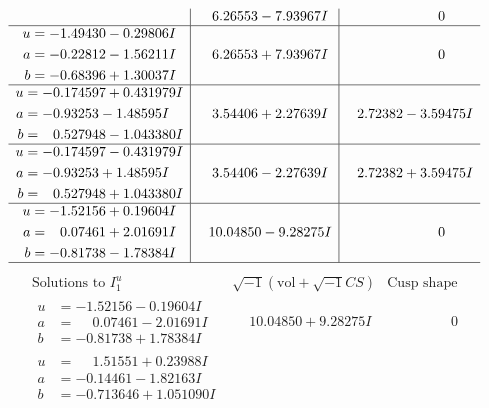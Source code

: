 \documentclass[1p]{elsarticle_modified}
\theoremstyle{definition}
\newcommand{\I}{\sqrt{-1}}
\begin{document}
$$\begin{array}{c|c|c}
 & \phantom{-}6.26553 - 7.93967 I & \phantom{-0.000000 } 0 \\ \hline\begin{aligned}
u &= -1.49430 - 0.29806 I \\
a &= -0.22812 - 1.56211 I \\
b &= -0.68396 + 1.30037 I\end{aligned}
 & \phantom{-}6.26553 + 7.93967 I & \phantom{-0.000000 } 0 \\ \hline\begin{aligned}
u &= -0.174597 + 0.431979 I \\
a &= -0.93253 - 1.48595 I \\
b &= \phantom{-}0.527948 - 1.043380 I\end{aligned}
 & \phantom{-}3.54406 + 2.27639 I & \phantom{-}2.72382 - 3.59475 I \\ \hline\begin{aligned}
u &= -0.174597 - 0.431979 I \\
a &= -0.93253 + 1.48595 I \\
b &= \phantom{-}0.527948 + 1.043380 I\end{aligned}
 & \phantom{-}3.54406 - 2.27639 I & \phantom{-}2.72382 + 3.59475 I \\ \hline\begin{aligned}
u &= -1.52156 + 0.19604 I \\
a &= \phantom{-}0.07461 + 2.01691 I \\
b &= -0.81738 - 1.78384 I\end{aligned}
 & \phantom{-}10.04850 - 9.28275 I & \phantom{-0.000000 } 0\\
 \hline 
 \end{array}$$\newpage$$\begin{array}{c|c|c}  
\text{Solutions to }I^u_{1}& \I (\text{vol} + \sqrt{-1}CS) & \text{Cusp shape}\\
 \hline 
\begin{aligned}
u &= -1.52156 - 0.19604 I \\
a &= \phantom{-}0.07461 - 2.01691 I \\
b &= -0.81738 + 1.78384 I\end{aligned}
 & \phantom{-}10.04850 + 9.28275 I & \phantom{-0.000000 } 0 \\ \hline\begin{aligned}
u &= \phantom{-}1.51551 + 0.23988 I \\
a &= -0.14461 - 1.82163 I \\
b &= -0.713646 + 1.051090 I\end{aligned}

\end{array}$$
\end{document}
